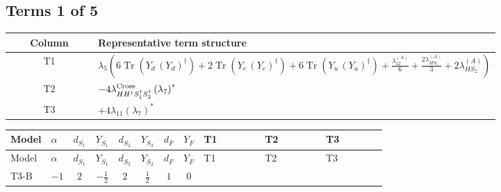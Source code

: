 \documentclass[8pt]{article}
\begin{document}
\begin{landscape}
\subsection*{Terms 1 of 5}
\begin{center}
\begin{tabular}{@{}c >{\raggedright\arraybackslash}p{0.82\linewidth}@{}}
\toprule
Column & Representative term structure \\
\midrule
T1 & \(\displaystyle {\lambda_5} \left(6 \operatorname{Tr}\!\left({Y_d}\,\left({Y_d}\right)^{\dagger}\right)+2 \operatorname{Tr}\!\left({Y_e}\,\left({Y_e}\right)^{\dagger}\right)+6 \operatorname{Tr}\!\left({Y_u}\,\left({Y_u}\right)^{\dagger}\right)+\frac{{\lambda_{12}^{(A)}}}{6}+\frac{2 {\lambda_{HS_1}^{(A)}}}{3}+2 {\lambda_{HS_2}^{(A)}}\right)\) \\
\midrule
T2 & \(\displaystyle -4 {\lambda_{H H^\dagger S_1^\dagger S_2^\dagger}^{\rm Cross}} \left({\lambda_7}\right)^{*}\) \\
\midrule
T3 & \(\displaystyle +4 {\lambda_{11}} \left({\lambda_7}\right)^{*}\) \\
\midrule
\bottomrule
\end{tabular}
\end{center}
\smallskip
\tiny
\begin{longtable}{@{}llcccccc >{\raggedright\arraybackslash}p{0.21\linewidth} >{\raggedright\arraybackslash}p{0.21\linewidth} >{\raggedright\arraybackslash}p{0.21\linewidth}@{}}
\toprule
Model & $\alpha$ & $d_{S_1}$ & $Y_{S_1}$ & $d_{S_2}$ & $Y_{S_2}$ & $d_F$ & $Y_F$ & T1 & T2 & T3 \\
\midrule
\endfirsthead
\toprule
Model & $\alpha$ & $d_{S_1}$ & $Y_{S_1}$ & $d_{S_2}$ & $Y_{S_2}$ & $d_F$ & $Y_F$ & T1 & T2 & T3 \\
\midrule
\endhead
T3-B & $-1$ & $2$ & $-\frac{1}{2}$ & $2$ & $\frac{1}{2}$ & $1$ & $0$ & \scriptsize\adjustbox{max width=\linewidth}{$\begin{gathered} {\lambda_5} \left(6 \operatorname{Tr}\!\left({Y_d}\,\left({Y_d}\right)^{\dagger}\right)+2 \operatorname{Tr}\!\left({Y_e}\,\left({Y_e}\right)^{\dagger}\right)+6 \operatorname{Tr}\!\left({Y_u}\,\left({Y_u}\right)^{\dagger}\right)+\frac{{\lambda_{12}^{(A)}}}{6}+\frac{2 {\lambda_{HS_1}^{(A)}}}{3}+2 {\lambda_{HS_2}^{(A)}}\right)\end{gathered}$} & \scriptsize\adjustbox{max width=\linewidth}{$\begin{gathered} -4 {\lambda_{H H^\dagger S_1^\dagger S_2^\dagger}^{\rm Cross}} \left({\lambda_7}\right)^{*}\end{gathered}$} & \scriptsize\adjustbox{max width=\linewidth}{$\begin{gathered} +4 {\lambda_{11}} \left({\lambda_7}\right)^{*}\end{gathered}$} \\

\end{longtable}
\end{landscape}
\end{document}
